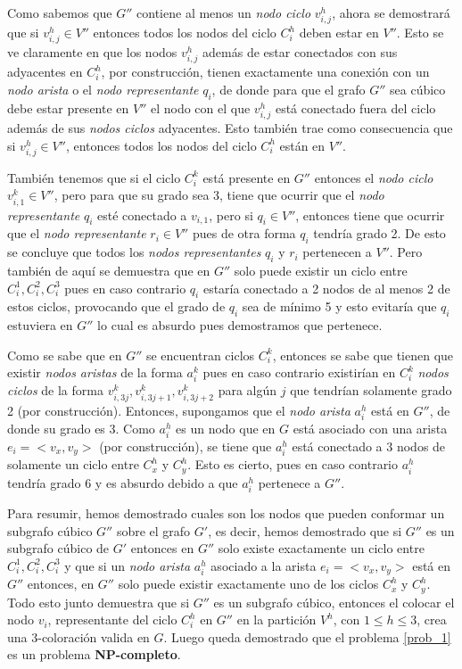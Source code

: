 \documentclass{article}
\begin{document}
Como sabemos que $G''$ contiene al menos un \textit{nodo ciclo} $v_{i,j}^h$, ahora se demostrará que si $v_{i,j}^h\in V''$ entonces todos los nodos del ciclo $C_i^h$ deben estar en $V''$. Esto se ve
claramente en que los nodos $v_{i,j}^h$ además de estar conectados con sus adyacentes en $C_i^h$, por construcción, tienen exactamente una conexión con un \textit{nodo arista} o el \textit{nodo representante} $q_i$,
de donde para que el grafo $G''$ sea cúbico debe estar presente en $V''$ el nodo con el que $v_{i,j}^h$ está conectado fuera del ciclo además de sus \textit{nodos ciclos} adyacentes. Esto también trae como consecuencia
que si $v_{i,j}^h\in V''$, entonces todos los nodos del ciclo $C_i^h$ están en $V''$.

También tenemos que si el ciclo $C_i^k$ está presente en $G''$ entonces el \textit{nodo ciclo} $v_{i,1}^k\in V''$, pero para que su grado sea 3, tiene que ocurrir que el
\textit{nodo representante} $q_i$ esté conectado a $v_{i,1}$, pero si $q_i\in V''$, entonces tiene que ocurrir que el \textit{nodo representante} $r_i\in V''$ pues de otra forma $q_i$ tendría grado 2.
De esto se concluye que todos los \textit{nodos representantes} $q_i$ y $r_i$ pertenecen a $V''$. Pero también de aquí se demuestra que en $G''$ solo puede existir un ciclo entre
$C_i^1, C_i^2, C_i^3$ pues en caso contrario $q_i$ estaría conectado a 2 nodos de al menos 2 de estos ciclos, provocando que el grado de $q_i$ sea de mínimo 5 y esto evitaría que $q_i$ estuviera en $G''$
lo cual es absurdo pues demostramos que pertenece.

Como se sabe que en $G''$ se encuentran ciclos $C_i^k$, entonces se sabe que tienen que existir \textit{nodos aristas} de la forma $a_i^k$ pues en caso contrario existirían en $C_i^k$ \textit{nodos ciclos}
de la forma $v_{i, 3j}^k, v_{i, 3j + 1}^k, v_{i, 3j + 2}^k$ para algún $j$ que tendrían solamente grado 2 (por construcción). Entonces, supongamos que el \textit{nodo arista} $a_i^h$ está en $G''$,
de donde su grado es 3. Como $a_i^h$ es un nodo que en $G$ está asociado con una arista $e_i = <v_x, v_y>$ (por construcción), se tiene que $a_i^h$ está conectado a 3 nodos de solamente un ciclo entre $C_x^h$ y  $C_y^h$.
Esto es cierto, pues en caso contrario $a_i^h$ tendría grado 6 y es absurdo debido a que $a_i^h$ pertenece a $G''$.

Para resumir, hemos demostrado cuales son los nodos que pueden conformar un subgrafo cúbico $G''$ sobre el grafo $G'$, es decir,
hemos demostrado que si $G''$ es un subgrafo cúbico de $G'$ entonces en $G''$ solo existe exactamente un ciclo entre $C_i^1,C_i^2,C_i^3$
y que si un \textit{nodo arista} $a_i^h$ asociado a la arista $e_i=<v_x,v_y>$ está en $G''$ entonces, en $G''$ solo puede existir exactamente
uno de los ciclos $C_x^h$ y $C_y^h$. Todo esto junto demuestra que si $G''$ es un subgrafo cúbico, entonces el colocar el nodo $v_i$,
representante del ciclo $C_i^h$ en $G''$ en la partición $V^h$, con $1\leq h\leq 3$, crea una 3-coloración valida en $G$. Luego queda demostrado
que el problema \ref{prob_1} es un problema \textbf{NP-completo}.
\end{document}
